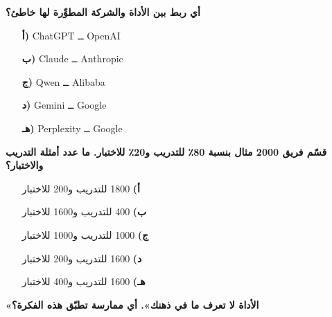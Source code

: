 \documentclass[11pt,a4paper]{article}
\begin{document}
\begin{multicols}{2}
\begin{minipage}{\linewidth}
\begin{itemize}[leftmargin=0.95cm, labelsep=4pt, itemsep=0pt, topsep=2pt, parsep=0pt]
\end{itemize}
\end{minipage}\par\vspace{7pt plus 4pt}
\noindent\begin{minipage}{\linewidth}
\hangindent=0.7cm\textbf{أي ربط بين الأداة والشركة المطوِّرة لها خاطئ؟}
\begin{itemize}[leftmargin=0.95cm, labelsep=4pt, itemsep=0pt, topsep=2pt, parsep=0pt]
  \item[\textbf{أ)}] \textenglish{ChatGPT} ــ \textenglish{OpenAI}
  \item[\textbf{ب)}] \textenglish{Claude} ــ \textenglish{Anthropic}
  \item[\textbf{ج)}] \textenglish{Qwen} ــ \textenglish{Alibaba}
  \item[\textbf{د)}] \textenglish{Gemini} ــ \textenglish{Google}
  \item[\textbf{هـ)}] \textenglish{Perplexity} ــ \textenglish{Google}
\end{itemize}
\end{minipage}\par\vspace{7pt plus 4pt}
\noindent\begin{minipage}{\linewidth}
\hangindent=0.7cm\textbf{قسّم فريق 2000 مثال بنسبة 80٪ للتدريب و20٪ للاختبار. ما عدد أمثلة التدريب والاختبار؟}
\begin{itemize}[leftmargin=0.95cm, labelsep=4pt, itemsep=0pt, topsep=2pt, parsep=0pt]
  \item[\textbf{أ)}] 1800 للتدريب و200 للاختبار
  \item[\textbf{ب)}] 400 للتدريب و1600 للاختبار
  \item[\textbf{ج)}] 1000 للتدريب و1000 للاختبار
  \item[\textbf{د)}] 1600 للتدريب و200 للاختبار
  \item[\textbf{هـ)}] 1600 للتدريب و400 للاختبار
\end{itemize}
\end{minipage}\par\vspace{7pt plus 4pt}
\noindent\begin{minipage}{\linewidth}
\hangindent=0.7cm\textbf{«الأداة لا تعرف ما في ذهنك». أي ممارسة تطبّق هذه الفكرة؟}
\begin{itemize}[leftmargin=0.95cm, labelsep=4pt, itemsep=0pt, topsep=2pt, parsep=0pt]

\end{itemize}
\end{minipage}
\end{multicols}
\end{document}
